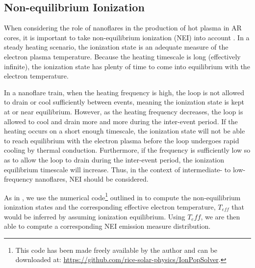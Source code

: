 \documentclass[apj]{emulateapj}
\begin{document}
	\subsection{Non-equilibrium Ionization}
	\label{subsec:nei}
	\par When considering the role of nanoflares in the production of hot plasma in AR cores, it is important to take non-equilibrium ionization (NEI) into account \citep{bradshaw_explosive_2006,reale_nonequilibrium_2008}. In a steady heating scenario, the ionization state is an adequate measure of the electron plasma temperature. Because the heating timescale is long (effectively infinite), the ionization state has plenty of time to come into equilibrium with the electron temperature. 
	\par In a nanoflare train, when the heating frequency is high, the loop is not allowed to drain or cool sufficiently between events, meaning the ionization state is kept at or near equilibrium. However, as the heating frequency decreases, the loop is allowed to cool and drain more and more during the inter-event period. If the heating occurs on a short enough timescale, the ionization state will not be able to reach equilibrium with the electron plasma before the loop undergoes rapid cooling by thermal conduction. Furthermore, if the frequency is sufficiently low so as to allow the loop to drain during the inter-event period, the ionization equilibrium timescale will increase. Thus, in the context of intermediate- to low-frequency nanoflares, NEI should be considered.
	\par As in , we use the numerical code\footnote{This code has been made freely available by the author and can be downloaded at: \url{https://github.com/rice-solar-physics/IonPopSolver}.} outlined in \citet{bradshaw_numerical_2009} to compute the non-equilibrium ionization states and the corresponding effective electron temperature, $T_{eff}$ that would be inferred by assuming ionization equilibrium. Using $T_eff$, we are then able to compute a corresponding NEI emission measure distribution.
\end{document}
